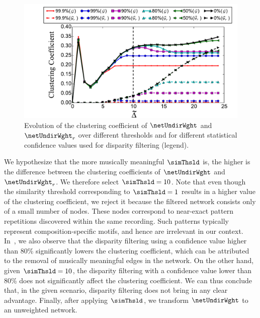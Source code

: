 {\begin{figure}
	\begin{center}
		\includegraphics[width=\figSizeNinety]{ch06_patterns/figures/Characterization/CC_Curves_shrunk.pdf}
	\end{center}
	\caption[Evolution of clustering coefficient of a network of melodic patterns]{Evolution of the clustering coefficient of $\netUndirWght$ and $\netUndirWght_r$ over different thresholds and for different statistical confidence values used for disparity filtering (legend).}
	\label{fig:cc_curve_pattern_characterization}
\end{figure}

We hypothesize that the more musically meaningful $\simThsld$ is, the higher is the difference between the clustering coefficients of $\netUndirWght$ and $\netUndirWght_r$. We therefore select $\simThsld=10$. Note that even though the similarity threshold corresponding to $\simThsld=1$ results in a higher value of the clustering coefficient, we reject it because the filtered network consists only of a small number of nodes. These nodes correspond to near-exact pattern repetitions discovered within the same recording. Such patterns typically represent composition-specific motifs, and hence are irrelevant in our context. In~, we also observe that the disparity filtering using a confidence value higher than 80\% significantly lowers the clustering coefficient, which can be attributed to the removal of musically meaningful edges in the network. On the other hand, given $\simThsld=10$, the disparity filtering with a confidence value lower than 80\% does not significantly affect the clustering coefficient. We can thus conclude that, in the given scenario, disparity filtering does not bring in any clear advantage. Finally, after applying $\simThsld$, we transform $\netUndirWght$ to an unweighted network. 


}
